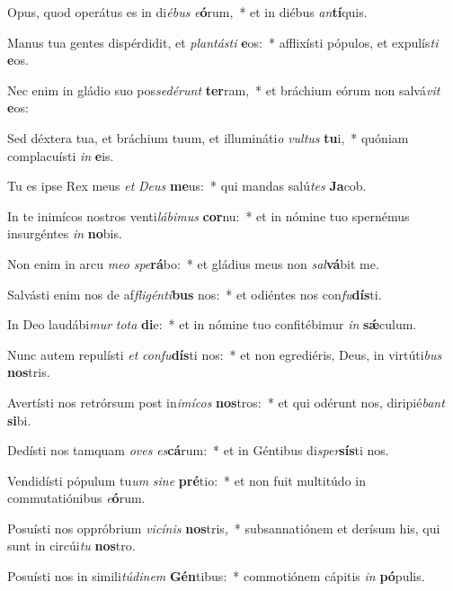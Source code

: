 \item Opus, quod operátus es in di\textit{é}\textit{bus} \textit{e}\textbf{ó}rum,~* et in diébus \textit{an}\textbf{tí}quis.
\item Manus tua gentes dispérdidit, et \textit{plan}\textit{tás}\textit{ti} \textbf{e}os:~* afflixísti pópulos, et expulís\textit{ti} \textbf{e}os.
\item Nec enim in gládio suo pos\textit{se}\textit{dé}\textit{runt} \textbf{ter}ram,~* et bráchium eórum non salvá\textit{vit} \textbf{e}os:
\item Sed déxtera tua, et bráchium tuum, et illumináti\textit{o} \textit{vul}\textit{tus} \textbf{tu}i,~* quóniam complacuísti \textit{in} \textbf{e}is.
\item Tu es ipse Rex meus \textit{et} \textit{De}\textit{us} \textbf{me}us:~* qui mandas salú\textit{tes} \textbf{Ja}cob.
\item In te inimícos nostros venti\textit{lá}\textit{bi}\textit{mus} \textbf{cor}nu:~* et in nómine tuo spernémus insurgéntes \textit{in} \textbf{no}bis.
\item Non enim in arcu \textit{me}\textit{o} \textit{spe}\textbf{rá}bo:~* et gládius meus non \textit{sal}\textbf{vá}bit me.
\item Salvásti enim nos de af\textit{fli}\textit{gén}\textit{ti}\textbf{bus} nos:~* et odiéntes nos con\textit{fu}\textbf{dís}ti.
\item In Deo laudábi\textit{mur} \textit{to}\textit{ta} \textbf{di}e:~* et in nómine tuo confitébimur \textit{in} \textbf{sǽ}culum.
\item Nunc autem repulísti \textit{et} \textit{con}\textit{fu}\textbf{dís}ti nos:~* et non egrediéris, Deus, in virtúti\textit{bus} \textbf{nos}tris.
\item Avertísti nos retrórsum post in\textit{i}\textit{mí}\textit{cos} \textbf{nos}tros:~* et qui odérunt nos, diripié\textit{bant} \textbf{si}bi.
\item Dedísti nos tamquam \textit{o}\textit{ves} \textit{es}\textbf{cá}rum:~* et in Géntibus di\textit{sper}\textbf{sís}ti nos.
\item Vendidísti pópulum tu\textit{um} \textit{si}\textit{ne} \textbf{pré}tio:~* et non fuit multitúdo in commutatiónibus \textit{e}\textbf{ó}rum.
\item Posuísti nos oppróbrium \textit{vi}\textit{cí}\textit{nis} \textbf{nos}tris,~* subsannatiónem et derísum his, qui sunt in circúi\textit{tu} \textbf{nos}tro.
\item Posuísti nos in simili\textit{tú}\textit{di}\textit{nem} \textbf{Gén}tibus:~* commotiónem cápitis \textit{in} \textbf{pó}pulis.
